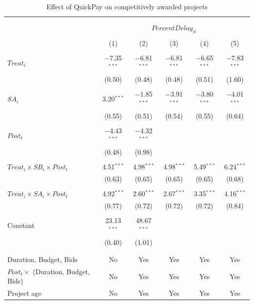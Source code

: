 \documentclass[
]{article}
\begin{document}
\begin{table}[H] \centering 
  \caption{Effect of QuickPay on competitively awarded projects} 
  \label{} 
\small 
\begin{tabular}{@{\extracolsep{-2pt}}lccccc} 
\\[-1.8ex]\hline 
\hline \\[-1.8ex] 
\\[-1.8ex] & \multicolumn{5}{c}{$PercentDelay_{it}$  } \\ 
\\[-1.8ex] & (1) & (2) & (3) & (4) & (5)\\ 
\hline \\[-1.8ex] 
 $Treat_i$ & $-$7.35$^{***}$ & $-$6.81$^{***}$ & $-$6.81$^{***}$ & $-$6.65$^{***}$ & $-$7.83$^{***}$ \\ 
  & (0.50) & (0.48) & (0.48) & (0.51) & (1.60) \\ 
  & & & & & \\ 
 $SA_i$ & 3.20$^{***}$ & $-$1.85$^{***}$ & $-$3.91$^{***}$ & $-$3.80$^{***}$ & $-$4.01$^{***}$ \\ 
  & (0.55) & (0.51) & (0.54) & (0.55) & (0.64) \\ 
  & & & & & \\ 
 $Post_t$ & $-$4.43$^{***}$ & $-$4.32$^{***}$ &  &  &  \\ 
  & (0.48) & (0.98) &  &  &  \\ 
  & & & & & \\ 
 $Treat_i \times SB_i \times Post_t$ & 4.51$^{***}$ & 4.98$^{***}$ & 4.98$^{***}$ & 5.49$^{***}$ & 6.24$^{***}$ \\ 
  & (0.63) & (0.65) & (0.65) & (0.65) & (0.68) \\ 
  & & & & & \\ 
 $Treat_i \times SA_i \times Post_t$ & 4.92$^{***}$ & 2.60$^{***}$ & 2.67$^{***}$ & 3.35$^{***}$ & 4.16$^{***}$ \\ 
  & (0.77) & (0.72) & (0.72) & (0.72) & (0.84) \\ 
  & & & & & \\ 
 Constant & 23.13$^{***}$ & 48.67$^{***}$ &  &  &  \\ 
  & (0.40) & (1.01) &  &  &  \\ 
  & & & & & \\ 
\hline \\[-1.8ex] 
Duration, Budget, Bids & No & Yes & Yes & Yes & Yes \\ 
$Post_t \times $  (Duration, Budget, Bids) & No & Yes & Yes & Yes & Yes \\ 
Project age & No & Yes & Yes & Yes & Yes \\ 

\end{tabular}
\end{table}
\end{document}
